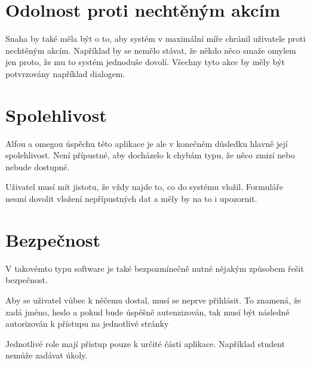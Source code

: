 \section{Odolnost proti nechtěným akcím}

Snaha by také měla být o to, aby systém v maximální míře chránil uživatele proti nechtěným akcím. Například by se nemělo stávat, že někdo něco smaže omylem jen proto, že mu to systém jednoduše dovolí. Všechny tyto akce by měly být potvrzovány například dialogem.



\section{Spolehlivost}

Alfou a omegou úspěchu této aplikace je ale v konečném důsledku hlavně její spolehlivost. Není přípustné, aby docházelo k chybám typu, že něco zmizí nebo nebude dostupné. 

Uživatel musí mít jistotu, že vždy najde to, co do systému vložil. Formuláře nesmí dovolit vložení nepřípustných dat a měly by na to i upozornit. 



\section{Bezpečnost}

V takovémto typu software je také bezpozmínečně nutné nějakým způsobem řešit bezpečnost.

Aby se uživatel vůbec k něčemu dostal, musí se neprve přihlásit. To znamená, že zadá jméno, heslo a pokud bude úspěšně autenzizován, tak musí být následně autorizován k přístupu na jednotlivé stránky

Jednotlivé role mají přístup pouze k určité části aplikace. Například student nemůže zadávat úkoly.
